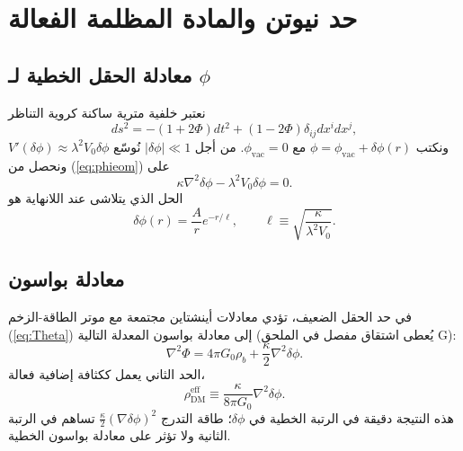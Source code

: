 \documentclass[12pt,a4paper]{article}
\begin{document}
	\section{حد نيوتن والمادة المظلمة الفعالة}
	
	\subsection{معادلة الحقل الخطية لـ \(\phi\)}
	نعتبر خلفية مترية ساكنة كروية التناظر
	\[
	ds^2 = -(1+2\Phi)dt^2 + (1-2\Phi)\delta_{ij}dx^i dx^j,
	\]
	ونكتب \(\phi = \phi_{\mathrm{vac}} + \delta\phi(r)\) مع \(\phi_{\mathrm{vac}} = 0\). من أجل \(|\delta\phi| \ll 1\) نُوسّع \(V'(\delta\phi) \approx \lambda^2 V_0 \delta\phi\) ونحصل من (\ref{eq:phieom}) على
	\begin{equation}
		\kappa \nabla^2 \delta\phi - \lambda^2 V_0 \delta\phi = 0.
		\label{eq:lin-phi}
	\end{equation}
	الحل الذي يتلاشى عند اللانهاية هو
	\begin{equation}
		\delta\phi(r) = \frac{A}{r} e^{-r/\ell}, \qquad \ell \equiv \sqrt{\frac{\kappa}{\lambda^2 V_0}}.
		\label{eq:deltaphi-sol}
	\end{equation}
	
	\subsection{معادلة بواسون}
	في حد الحقل الضعيف، تؤدي معادلات أينشتاين مجتمعة مع موتر الطاقة-الزخم (\ref{eq:Theta}) إلى معادلة بواسون المعدلة التالية (يُعطى اشتقاق مفصل في الملحق G):
	\begin{equation}
		\nabla^2 \Phi = 4\pi G_0 \rho_b + \frac{\kappa}{2} \nabla^2 \delta\phi.
		\label{eq:poisson}
	\end{equation}
	الحد الثاني يعمل ككثافة إضافية فعالة،
	\begin{equation}
		\rho_{\mathrm{DM}}^{\mathrm{eff}} \equiv \frac{\kappa}{8\pi G_0} \nabla^2 \delta\phi.
		\label{eq:rhoDM}
	\end{equation}
	هذه النتيجة دقيقة في الرتبة الخطية في \(\delta\phi\)؛ طاقة التدرج \(\frac{\kappa}{2}(\nabla\delta\phi)^2\) تساهم في الرتبة الثانية ولا تؤثر على معادلة بواسون الخطية.
	
\end{document}
